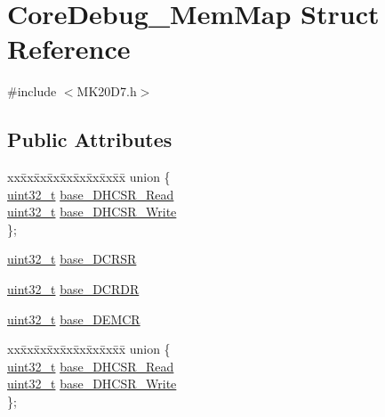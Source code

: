\hypertarget{struct_core_debug___mem_map}{}\section{Core\+Debug\+\_\+\+Mem\+Map Struct Reference}
\label{struct_core_debug___mem_map}


{\ttfamily \#include $<$M\+K20\+D7.\+h$>$}

\subsection*{Public Attributes}
\begin{DoxyCompactItemize}
\item 
\begin{tabbing}
xx\=xx\=xx\=xx\=xx\=xx\=xx\=xx\=xx\=\kill
union \{\\
\>\hyperlink{_p_e___types_8h_a33594304e786b158f3fb30289278f5af}{uint32\_t} \hyperlink{struct_core_debug___mem_map_a4968901505f61e2a98c9196a8ac7584b}{base\_DHCSR\_Read}\\
\>\hyperlink{_p_e___types_8h_a33594304e786b158f3fb30289278f5af}{uint32\_t} \hyperlink{struct_core_debug___mem_map_a57de52c8c1eb5789546543f2408ce487}{base\_DHCSR\_Write}\\
\}; \\

\end{tabbing}\item 
\hyperlink{_p_e___types_8h_a33594304e786b158f3fb30289278f5af}{uint32\+\_\+t} \hyperlink{struct_core_debug___mem_map_ad9c98f7390e5d3a6b54df56ddea32e8b}{base\+\_\+\+D\+C\+R\+SR}
\item 
\hyperlink{_p_e___types_8h_a33594304e786b158f3fb30289278f5af}{uint32\+\_\+t} \hyperlink{struct_core_debug___mem_map_aac76a717b2aba2ccbf75e020cc71fb3e}{base\+\_\+\+D\+C\+R\+DR}
\item 
\hyperlink{_p_e___types_8h_a33594304e786b158f3fb30289278f5af}{uint32\+\_\+t} \hyperlink{struct_core_debug___mem_map_a13a099e668fcb3587b2cd6eb8f8608d5}{base\+\_\+\+D\+E\+M\+CR}
\item 
\begin{tabbing}
xx\=xx\=xx\=xx\=xx\=xx\=xx\=xx\=xx\=\kill
union \{\\
\>\hyperlink{_p_e___types_8h_a33594304e786b158f3fb30289278f5af}{uint32\_t} \hyperlink{struct_core_debug___mem_map_a4968901505f61e2a98c9196a8ac7584b}{base\_DHCSR\_Read}\\
\>\hyperlink{_p_e___types_8h_a33594304e786b158f3fb30289278f5af}{uint32\_t} \hyperlink{struct_core_debug___mem_map_a57de52c8c1eb5789546543f2408ce487}{base\_DHCSR\_Write}\\
\}; \\


\end{tabbing}
\end{DoxyCompactItemize}
